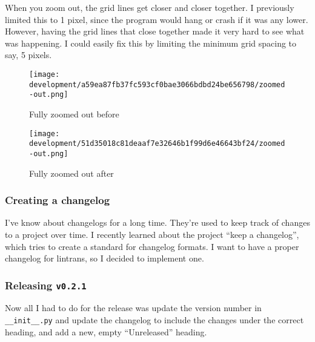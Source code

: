 \documentclass[../development.tex]{subfiles}
\begin{document}
When you zoom out, the grid lines get closer and closer together. I previously limited this to 1 pixel, since the program would hang or crash if it was any lower. However, having the grid lines that close together made it very hard to see what was happening. I could easily fix this by limiting the minimum grid spacing to say, 5 pixels.

\begin{figure}[H]
	\centering
	\begin{minipage}{0.48\linewidth}
		\centering
		\texttt{[image: development/a59ea87fb37fc593cf0bae3066bdbd24be656798/zoomed-out.png]}
		\caption{Fully zoomed out before}
		\label{fig:development:a59ea87fb37fc593cf0bae3066bdbd24be656798:zoomed-out.png}
	\end{minipage}\hfill
	\begin{minipage}{0.48\linewidth}
		\centering
		\texttt{[image: development/51d35018c81deaaf7e32646b1f99d6e46643bf24/zoomed-out.png]}
		\caption{Fully zoomed out after}
		\label{fig:development:51d35018c81deaaf7e32646b1f99d6e46643bf24:zoomed-out.png}
	\end{minipage}
\end{figure}


\subsubsection{Creating a changelog\label{development:preparing-for-v0.2.1:creating-a-changelog}}

I've know about changelogs for a long time. They're used to keep track of changes to a project over time. I recently learned about the project \enquote{keep a changelog}, which tries to create a standard for changelog formats\cite{keep-a-changelog-1.0.0}. I want to have a proper changelog for lintrans, so I decided to implement one.


\subsubsection{Releasing \texttt{v0.2.1}\label{development:preparing-for-v0.2.1:releasing-v0.2.1}}

Now all I had to do for the release was update the version number in \texttt{\_\_init\_\_.py} and update the changelog to include the changes under the correct heading, and add a new, empty \enquote{Unreleased} heading.
\end{document}
